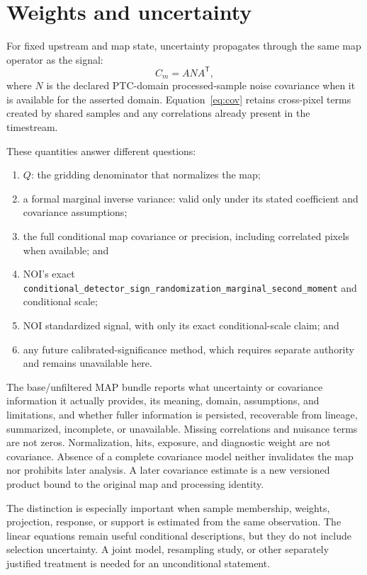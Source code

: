 \documentclass[10pt]{article}
\newcommand{\code}[1]{\nolinkurl{#1}}
\begin{document}
\clearpage
\section{Weights and uncertainty}\label{sec:uncertainty}
For fixed upstream and map state, uncertainty propagates through the same map
operator as the signal:
\begin{equation}
 C_m=A N A^{\mathsf T},
 \label{eq:cov}
\end{equation}
where \(N\) is the declared PTC-domain processed-sample noise covariance when
it is available for the asserted domain. Equation~\eqref{eq:cov}
retains cross-pixel terms created by shared samples and any correlations
already present in the timestream.

These quantities answer different questions:
\begin{enumerate}
\item \(Q\): the gridding denominator that normalizes the map;
\item a formal marginal inverse variance: valid only under its stated
coefficient and covariance assumptions;
\item the full conditional map covariance or precision, including correlated
pixels when available; and
\item NOI's exact
\code{conditional_detector_sign_randomization_marginal_second_moment} and
conditional scale;
\item NOI standardized signal, with only its exact conditional-scale claim;
and
\item any future calibrated-significance method, which requires separate
authority and remains unavailable here.
\end{enumerate}

\SCIMapNOIOwnershipStatement

The base/unfiltered MAP bundle reports what uncertainty or covariance information it
actually provides, its meaning, domain, assumptions, and limitations, and
whether fuller information is persisted, recoverable from lineage,
summarized, incomplete, or unavailable. Missing correlations and nuisance
terms are not zeros. Normalization, hits, exposure, and diagnostic weight are
not covariance. Absence of a complete covariance model neither invalidates the
map nor prohibits later analysis. A later covariance estimate is a new
versioned product bound to the original map and processing identity.

The distinction is especially important when sample membership, weights,
projection, response, or support is estimated from the same observation. The
linear equations remain useful conditional descriptions, but they do not
include selection uncertainty. A joint model, resampling study, or other
separately justified treatment is needed for an unconditional statement.
\end{document}
